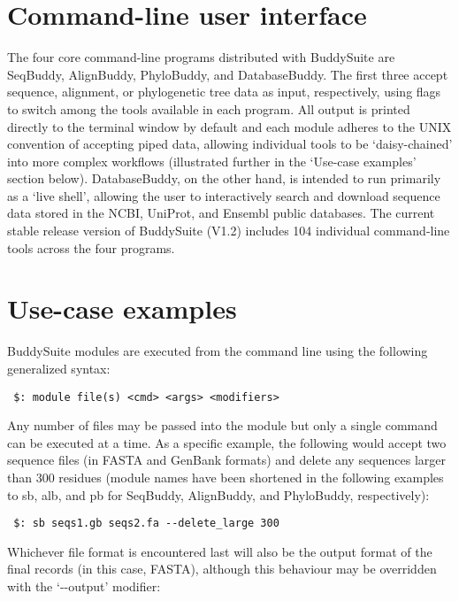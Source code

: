 \documentclass[nogrid]{MBE_article}%
\begin{document}
\section{Command-line user interface}
The four core command-line programs distributed with BuddySuite are SeqBuddy, AlignBuddy, PhyloBuddy, and DatabaseBuddy. The first three accept sequence, alignment, or phylogenetic tree data as input, respectively, using flags to switch among the tools available in each program. All output is printed directly to the terminal window by default and each module adheres to the UNIX convention of accepting piped data, allowing individual tools to be `daisy-chained' into more complex workflows (illustrated further in the `Use-case examples' section below). DatabaseBuddy, on the other hand, is intended to run primarily as a `live shell', allowing the user to interactively search and download sequence data stored in the NCBI, UniProt, and Ensembl public databases. The current stable release version of BuddySuite (V1.2) includes 104 individual command-line tools across the four programs.

\section{Use-case examples}
BuddySuite modules are executed from the command line using the following generalized syntax:

\smallskip

{\small
\begin{verbatim}
 $: module file(s) <cmd> <args> <modifiers>
\end{verbatim}
}
\smallskip

Any number of files may be passed into the module but only a single command can be executed at a time. As a specific example, the following would accept two sequence files (in FASTA and GenBank formats) and delete any sequences larger than 300 residues (module names have been shortened in the following examples to sb, alb, and pb for SeqBuddy, AlignBuddy, and PhyloBuddy, respectively):

\smallskip

{\small
\begin{verbatim}
 $: sb seqs1.gb seqs2.fa --delete_large 300
\end{verbatim}
}
\smallskip

Whichever file format is encountered last will also be the output format of the final records (in this case, FASTA), although this behaviour may be overridden with the `-{}-output' modifier:
\end{document}
